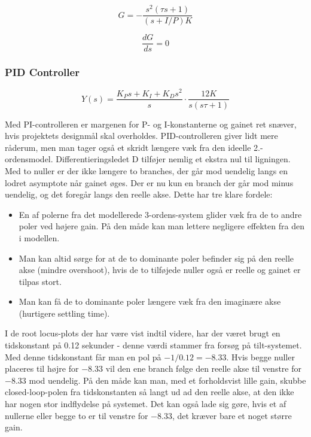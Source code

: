 \begin{equation}
G=-\frac{s^2(\tau s+1)}{(s+I/P)K}
\end{equation}

\begin{equation}
\frac{dG}{ds}=0
\end{equation}

\subsubsection{PID Controller}

\begin{equation}\label{eq:PID_OpenLoop}
Y(s)=\frac{K_{P}s+K_{I}+K_{D}s^2}{s}\cdot\frac{12K}{s(s\tau+1)}
\end{equation}

Med PI-controlleren er margenen for P- og I-konstanterne og gainet ret snæver, hvis projektets designmål skal overholdes. PID-controlleren giver lidt mere råderum, men man tager også et skridt længere væk fra den ideelle 2.-ordensmodel. Differentieringsledet D tilføjer nemlig et ekstra nul til ligningen. Med to nuller er der ikke længere to branches, der går mod uendelig langs en lodret asymptote når gainet øges. Der er nu kun en branch der går mod minus uendelig, og det foregår langs den reelle akse. Dette har tre klare fordele:

\begin{itemize}
	\item 	En af polerne fra det modellerede 3-ordens-system glider væk fra de to andre poler ved højere gain. På den måde kan man lettere negligere effekten fra den i modellen.
	\item  	Man kan altid sørge for at de to dominante poler befinder sig på den 				   	reelle akse (mindre overshoot), hvis de to tilføjede nuller også er reelle og gainet er tilpas stort. 
	\item  	Man kan få de to dominante poler længere væk fra den imaginære akse 					(hurtigere settling time).
\end{itemize}

I de root locus-plots der har være vist indtil videre, har der været brugt en tidskonstant på 0.12 sekunder - denne værdi stammer fra forsøg på tilt-systemet. Med denne tidskonstant får man en pol på $-1/0.12=-8.33$. Hvis begge nuller placeres til højre for $-8.33$ vil den ene branch følge den reelle akse til venstre for $-8.33$ mod uendelig. På den måde kan man, med et forholdsvist lille gain, skubbe closed-loop-polen fra tidskonstanten så langt ud ad den reelle akse, at den ikke har nogen stor indflydelse på systemet. Det kan også lade sig gøre, hvis et af nullerne eller begge to er til venstre for $-8.33$, det kræver bare et noget større gain.

